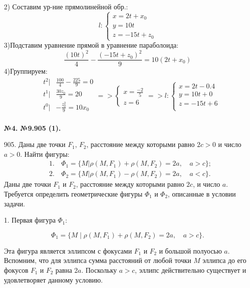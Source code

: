 \documentclass[a4paper,14pt]{extreport} %
\begin{document}
2) Составим ур-ние прямолинейной обр.: 
\[
  l: \begin{cases}
    x = 2t + x_0\\ 
    y = 10t \\
    z = -15t + z_0
  \end{cases}
\]
3)Подставим уравнение прямой в уравнение параболоида:
\[
  \frac{(10t)^2}{4} - \frac{(-15t+z_0)^2}{9} = 10(2t+x_0)
\]
4)Группируем: 
\[
\begin{aligned}
  &t^2|   &\frac{100}{4} - \frac{225}{9} = 0\\
  &t^1|   &\frac{30z_0}{9}=20\\
  &t^0|  &-\frac{z_0^2}{9} = 10x_0\\
\end{aligned} =>
  \begin{cases}
    x = \frac{-2}{5}\\ 
    z = 6 
  \end{cases} =>l: \begin{cases}
    x = 2t-0.4\\ 
    y = 10t+0\\ 
    z = -15t +6\\
  \end{cases}
\]  




\textbf{№4. №9.905 (1).}

905. Даны две точки $F_1$, $F_2$, расстояние между которыми равно $2c > 0$ и число $a > 0$. Найти фигуры:
\[
\begin{aligned}
    &1. \quad \Phi_1 = \{M | \rho(M, F_1) + \rho(M, F_2) = 2a, \quad a > c\}; \\
    &2. \quad \Phi_2 = \{M | \rho(M, F_1) - \rho(M, F_2) = 2a, \quad a < c\}.
\end{aligned}
\]
\noindent
Даны две точки \( F_1 \) и \( F_2 \), расстояние между которыми равно \( 2c \), и число \( a \). Требуется определить геометрические фигуры \( \Phi_1 \) и \( \Phi_2 \), описанные в условии задачи.

1. Первая фигура \( \Phi_1 \):

   \[
   \Phi_1 = \{ M \mid \rho(M, F_1) + \rho(M, F_2) = 2a, \quad a > c \}.
   \]

   Эта фигура является эллипсом с фокусами \( F_1 \) и \( F_2 \) и большой полуосью \( a \). Вспомним, что для эллипса сумма расстояний от любой точки \( M \) эллипса до его фокусов \( F_1 \) и \( F_2 \) равна \( 2a \). Поскольку \( a > c \), эллипс действительно существует и удовлетворяет данному условию. 
\end{document}
